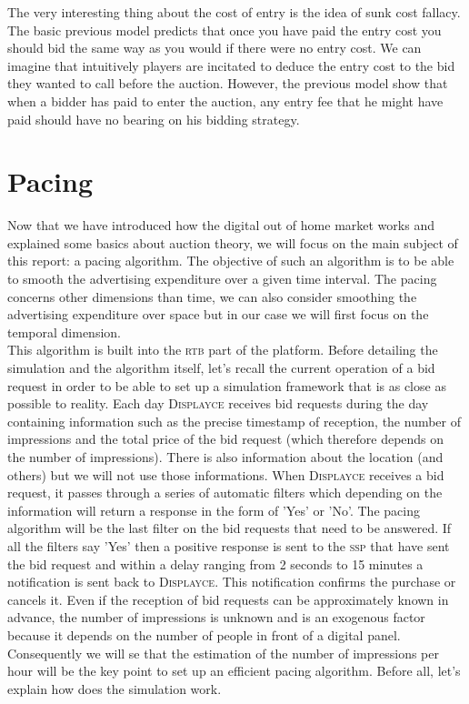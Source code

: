 \documentclass[12pt]{article}
\newcommand{\disp}{\textsc{Displayce}\xspace}
\begin{document}
The very interesting thing about the cost of entry is the idea of sunk cost fallacy. The basic previous model predicts that once you have paid the entry cost you should bid the same way as you would if there were no entry cost. We can imagine that intuitively players are incitated to deduce the entry cost to the bid they wanted to call before the auction. However, the previous model show that when a bidder has paid to enter the auction, any entry fee that he might have paid should have no bearing on his bidding strategy.

\newpage

\section{Pacing}

Now that we have introduced how the digital out of home market works and explained some basics about auction theory, we will focus on the main subject of this report: a pacing algorithm. The objective of such an algorithm is to be able to smooth the advertising expenditure over a given time interval. The pacing concerns other dimensions than time, we can also consider smoothing the advertising expenditure over space but in our case we will first focus on the temporal dimension. \\

This algorithm is built into the \textsc{rtb} part of the platform. Before detailing the simulation and the algorithm itself, let's recall the current operation of a bid request in order to be able to set up a simulation framework that is as close as possible to reality. 
Each day \disp receives bid requests during the day containing information such as the precise timestamp of reception, the number of impressions and the total price of the bid request (which therefore depends on the number of impressions). There is also information about the location (and others) but we will not use those informations. When \disp receives a bid request, it passes through a series of automatic filters which depending on the information will return a response in the form of 'Yes' or 'No'. The pacing algorithm will be the last filter on the bid requests that need to be answered. If all the filters say 'Yes' then a positive response is sent to the \textsc{ssp} that have sent the bid request and within a delay ranging from 2 seconds to 15 minutes a notification is sent back to \disp. This notification confirms the purchase or cancels it. Even if the reception of bid requests can be approximately known in advance, the number of impressions is unknown and is an exogenous factor because it depends on the number of people in front of a digital panel. Consequently we will se that the estimation of the number of impressions per hour will be the key point to set up an efficient pacing algorithm. Before all, let's explain how does the simulation work.
\end{document}
